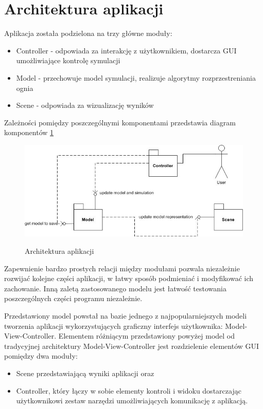 \section {Architektura aplikacji}
Aplikacja została podzielona na trzy główne moduły:
\begin{itemize}
\item Controller - odpowiada za interakcję z użytkownikiem, dostarcza GUI umożliwiające kontrolę symulacji
\item Model - przechowuje model symulacji, realizuje algorytmy rozprzestreniania ognia
\item Scene - odpowiada za wizualizację wyników
\end{itemize}
Zależności pomiędzy poszczególnymi komponentami przedstawia diagram komponentów \ref{architektura aplikacji}
\begin{figure}
\begin {center}
\includegraphics{architectureComponentDiagram.jpg} \\
\caption { Architektura aplikacji}
\label {architektura aplikacji}
\end {center}
\end{figure}
Zapewnienie bardzo prostych relacji między modułami pozwala niezależnie rozwijać kolejne części aplikacji, w łatwy
sposób podmieniać i modyfikować ich zachowanie. Inną zaletą zastosowanego modelu jest łatwość
testowania poszczególnych części programu niezależnie.

Przedstawiony model powstał na bazie jednego z najpopularniejszych modeli tworzenia aplikacji wykorzystujących graficzny interfejs użytkownika: Model-View-Controller. Elementem różniącym przedstawiony powyżej model od tradycyjnej architektury Model-View-Controller
jest rozdzielenie elementów GUI pomiędzy dwa moduły:
\begin{itemize}
\item Scene przedstawiającą wyniki aplikacji oraz
\item Controller, który łączy w sobie elementy kontroli i widoku dostarczając użytkownikowi zestaw narzędzi umożliwiających komunikację z aplikacją.
\end {itemize}
